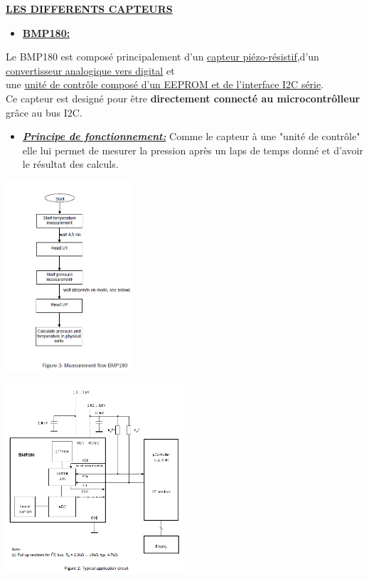 \documentclass[a4paper,12pt]{report}
\begin{document}
\underline{\textbf{LES DIFFERENTS CAPTEURS}}


\hfill

\begin{itemize} 
\setlength{\itemindent}{1cm}
 \item \underline{\textbf{BMP180:}}
\end{itemize}

\setlength{\itemindent}{3cm}

Le BMP180 est composé principalement d'un \underline{capteur piézo-résistif},d'un \underline{convertisseur analogique vers digital} 
et \\ une \underline{unité de contrôle composé d'un EEPROM et de l'interface I2C série}.\\

Ce capteur est designé pour être \textbf{directement connecté au microcontrôlleur} grâce au bus I2C. 

\begin{itemize}
\centering
\setlength{\itemindent}{2cm}
\item \underline{\textit{\textbf{Principe de fonctionnement:}}} Comme le capteur à une "unité de
 contrôle" elle lui permet de mesurer la pression après un laps de temps donné et d'avoir le résultat des calculs.    
\end{itemize} 


\centering
\includegraphics[width=0.35\textwidth]{2.png}



\includegraphics[width=0.50\textwidth]{sblck.png}\\
\end{document}

